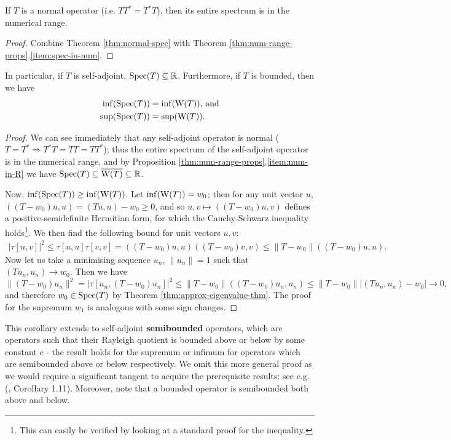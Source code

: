 \documentclass[../main.tex]{subfiles}
\begin{document}
\begin{corollary}\label{thm:normal-spec-in-num}
  If $T$ is a normal operator (i.e. $TT^* = T^*T$),
  then its entire spectrum is in the numerical range.
\end{corollary}
\begin{proof}
Combine Theorem \ref{thm:normal-spec} with Theorem \ref{thm:num-range-props}.\ref{item:spec-in-num}.
\end{proof}

\begin{corollary}\label{thm:self-adj-num-range}
  In particular, if $T$ is self-adjoint, $\mathrm{Spec}(T) \subseteq \mathbb{R}$.
  Furthermore, if $T$ is bounded, then we have 
  \begin{align*}
    \inf(\mathrm{Spec}(T)) & = \inf(\mathrm{W}(T))\text{, and}\\
    \sup(\mathrm{Spec}(T)) & = \sup(\mathrm{W}(T)).
  \end{align*}
\end{corollary}
\begin{proof}
We can see immediately that any self-adjoint operator is normal ($T = T^*
\Rightarrow T^*T = TT = TT^*$); thus the entire spectrum of the
self-adjoint operator is in the numerical range, and by Proposition
\ref{thm:num-range-props}.\ref{item:num-in-R} we have $\mathrm{Spec}(T)
\subseteq \overline{\mathrm{W}(T)} \subseteq \mathbb{R}$.

Now, $\inf(\mathrm{Spec}(T)) \geq \inf(\mathrm{W}(T))$. Let $\inf(\mathrm{W}(T)) = w_0$; then for
any unit vector $u$, $((T - w_0)u, u)  = (Tu, u) - w_0 \geq 0$, and so
$u, v \mapsto ((T - w_0)u, v)$ defines a positive-semidefinite Hermitian
form, for which the Cauchy-Schwarz inequality holds\footnote{This can
easily be verified by looking at a standard proof for the inequality.}.
We then find the following bound for unit vectors $u, v$:
\begin{align*}
|\tau[u,v]|^2 \leq \tau[u, u] \tau[v, v] = ((T - w_0)u, u)((T - w_0)v, v) 
					 \leq \|T - w_0\|((T - w_0)u, u).
\end{align*}
Now let us take a minimising sequence $u_n$, $\|u_n\| = 1$ such that 
$(Tu_n, u_n) \rightarrow w_0$.
Then we have
\begin{equation*}
\|(T - w_0)u_n\|^2 = |\tau[u_n, (T - w_0)u_n]|^2  
		   \leq \|T - w_0\|((T - w_0)u_n, u_n) 
		   \leq \|T - w_0\||(Tu_n, u_n) - w_0| 
		   \rightarrow 0,
\end{equation*}
and therefore $w_0 \in \mathrm{Spec}(T)$ by Theorem \ref{thm:approx-eigenvalue-thm}.
The proof for the supremum $w_1$ is analogous with some sign changes.
\end{proof}
This corollary extends to self-adjoint
\textbf{semibounded} operators, which are operators
such that their Rayleigh quotient is bounded above or below by some constant $c$
- the result holds for the supremum or infimum for operators which are
semibounded above or below respectively. We omit this more general proof as we
would require a significant tangent to acquire the prerequisite results: see
e.g. (\cite{frank2022schrodinger}, Corollary 1.11). Moreover, note that a
bounded operator is semibounded both above and below.
\end{document}
